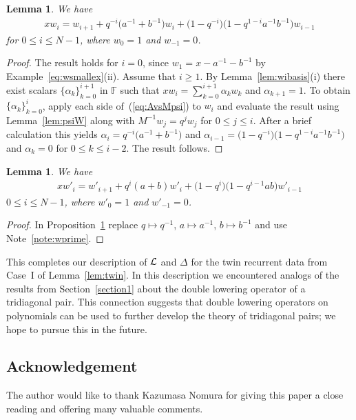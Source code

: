 \documentclass[pdftex]{sigma}
\numberwithin{equation}{section}
\newtheorem{Lemma}[Theorem]{Lemma}
\begin{document}
\begin{Lemma}\label{prop:3trec} We have
\begin{gather*}
x w_i = w_{i+1} + q^{-i}\big(a^{-1}+b^{-1}\big)w_i + \big(1-q^{-i}\big)\big(1-q^{1-i}a^{-1}b^{-1}\big)w_{i-1}
\end{gather*}
for $0 \leq i \leq N-1$, where $w_0=1$ and $w_{-1}=0$.
\end{Lemma}
\begin{proof}The result holds for $i=0$, since $w_1=x-a^{-1}-b^{-1}$
by Example~\ref{eq:wsmallex}(ii).
Assume that $i\geq 1$. By Lemma~\ref{lem:wibasis}(i) there exist
scalars $\lbrace \alpha_k \rbrace_{k=0}^{i+1}$ in $\mathbb F$
such that
$xw_i = \sum_{k=0}^{i+1} \alpha_k w_k$ and $\alpha_{k+1}=1$.
To obtain $\lbrace \alpha_k \rbrace_{k=0}^{i}$, apply each side of~(\ref{eq:AvsMpsi}) to $w_i$ and evaluate the result using
Lemma~\ref{lem:psiW} along with
$M^{-1}w_j = q^j w_j$ for $0 \leq j \leq i$.
After a brief calculation this yields
$\alpha_i = q^{-i}\big(a^{-1}+b^{-1}\big)$ and
$\alpha_{i-1} =
\big(1-q^{-i}\big)\big(1-q^{1-i}a^{-1}b^{-1}\big)$ and
$\alpha_k = 0 $ for $0 \leq k \leq i-2$.
The result follows.
\end{proof}

\begin{Lemma}\label{prop:3trecprme} We have
\begin{gather*}
x w'_i = w'_{i+1} + q^{i}(a+b)w'_i + \big(1-q^{i}\big)\big(1-q^{i-1}ab\big)w'_{i-1}
\end{gather*}
$0 \leq i \leq N-1$, where $w'_0=1$ and $w'_{-1}=0$.
\end{Lemma}
\begin{proof} In Proposition~\ref{prop:3trec} replace
$q\mapsto q^{-1}$,
$a\mapsto a^{-1}$,
$b\mapsto b^{-1}$
and use Note~\ref{note:wprime}.
\end{proof}

This completes our description of $\cal L$ and $\Delta$ for the twin recurrent data from Case~I of Lemma~\ref{lem:twin}. In this description we encountered analogs of the results from Section~\ref{section1} about the double lowering operator of a tridiagonal pair. This connection suggests that double lowering operators on polynomials can be used to further develop the theory of
tridiagonal pairs; we hope to pursue this in the future.

\subsection*{Acknowledgement} The author would like to thank Kazumasa Nomura
for giving this paper a close reading and offering many valuable comments.
\end{document}
